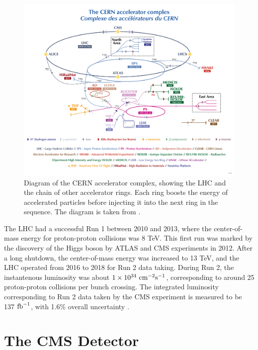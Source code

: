 \begin{figure}[htb]
    \begin{minipage}[t]{\linewidth}\centering
        \includegraphics[width=15cm]{lhc_complex.png}
    \end{minipage}
    \caption{Diagram of the CERN accelerator complex, showing the LHC and the chain of other accelerator rings. 
    Each ring boosts the energy of accelerated particles before injecting it into the next ring in the sequence.
    The diagram is taken from \cite{LHCAcceleratorComplex}.}
    \label{fig:lhc_diagram}
\end{figure}

The LHC had a successful Run 1 between 2010 and 2013, where the center-of-mass energy for proton-proton collisions was 8 TeV. This first run was marked 
by the discovery of the Higgs boson by ATLAS and CMS experiments in 2012. After a long shutdown, the center-of-mass energy was increased to 13 TeV, and the LHC
operated from 2016 to 2018 for Run 2 data taking. During Run 2, the instantenous luminosity was about $1 \times 10^{34} \ \textrm{cm}^{-2}\textrm{s}^{-1}$, corresponding to around 
25 proton-proton collisions per bunch crossing. The integrated luminosity corresponding to Run 2 data taken by the CMS experiment is measured to be 137 $\textrm{fb}^{-1}$, 
with 1.6\% overall uncertainty \cite{lumi:2018,lumi:2017,lumi:2016}.

\section{The CMS Detector}

